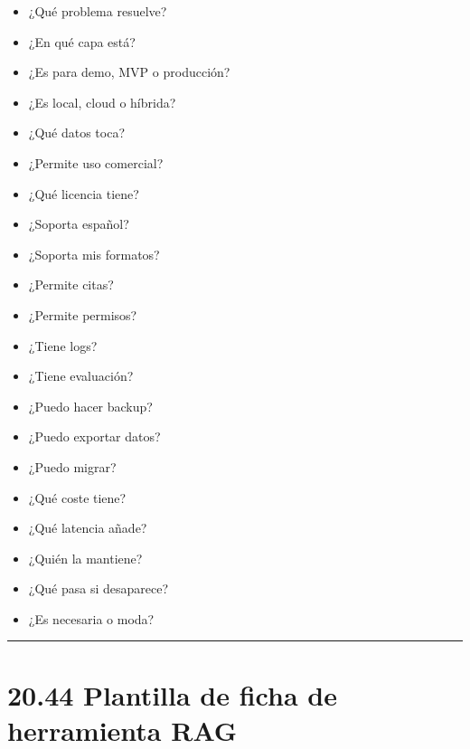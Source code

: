 \begin{itemize}
\tightlist
\item
  ¿Qué problema resuelve?
\item
  ¿En qué capa está?
\item
  ¿Es para demo, MVP o producción?
\item
  ¿Es local, cloud o híbrida?
\item
  ¿Qué datos toca?
\item
  ¿Permite uso comercial?
\item
  ¿Qué licencia tiene?
\item
  ¿Soporta español?
\item
  ¿Soporta mis formatos?
\item
  ¿Permite citas?
\item
  ¿Permite permisos?
\item
  ¿Tiene logs?
\item
  ¿Tiene evaluación?
\item
  ¿Puedo hacer backup?
\item
  ¿Puedo exportar datos?
\item
  ¿Puedo migrar?
\item
  ¿Qué coste tiene?
\item
  ¿Qué latencia añade?
\item
  ¿Quién la mantiene?
\item
  ¿Qué pasa si desaparece?
\item
  ¿Es necesaria o moda?
\end{itemize}

\begin{center}\rule{0.5\linewidth}{0.5pt}\end{center}

\section{20.44 Plantilla de ficha de herramienta
RAG}\label{plantilla-de-ficha-de-herramienta-rag}

